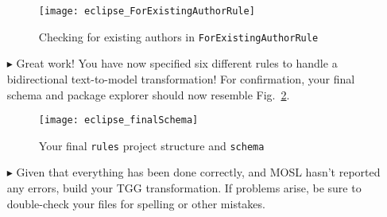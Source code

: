 \begin{itemize}
\vspace{0.5cm}

\begin{figure}[htbp]
\begin{center}
  \texttt{[image: eclipse\_ForExistingAuthorRule]}
  \caption{Checking for existing authors in \texttt{ForExistingAuthorRule}}
  \label{eclipse:ForExistingAuthorRule}
\end{center}
\end{figure}

\newpage

\item[$\blacktriangleright$] Great work! You have now specified six different rules to handle a bidirectional text-to-model transformation! For confirmation,
your final schema and package explorer should now resemble Fig.~\ref{eclipse:schemaFinal}.

\vspace{0.5cm}

\begin{figure}[htbp]
\begin{center}
  \texttt{[image: eclipse\_finalSchema]}
  \caption{Your final \texttt{rules} project structure and \texttt{schema}}
  \label{eclipse:schemaFinal}
\end{center}
\end{figure}

\vspace{0.5cm}

\item[$\blacktriangleright$] Given that everything has been done correctly, and MOSL hasn't reported any errors, build your TGG transformation. If problems
arise, be sure to double-check your files for spelling or other mistakes.

\end{itemize}
